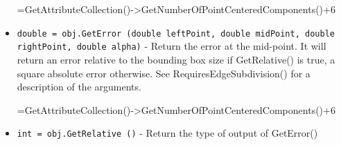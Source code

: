 \begin{itemize}
 
 
 
 
          =GetAttributeCollection()->GetNumberOfPointCenteredComponents()+6

\item  \verb|double = obj.GetError (double leftPoint, double midPoint, double rightPoint, double alpha)| -  Return the error at the mid-point. It will return an error relative to
 the bounding box size if GetRelative() is true, a square absolute error
 otherwise.
 See RequiresEdgeSubdivision() for a description of the arguments.
 
 
 
 
 
          =GetAttributeCollection()->GetNumberOfPointCenteredComponents()+6
 

\item  \verb|int = obj.GetRelative ()| -  Return the type of output of GetError()

\end{itemize}
